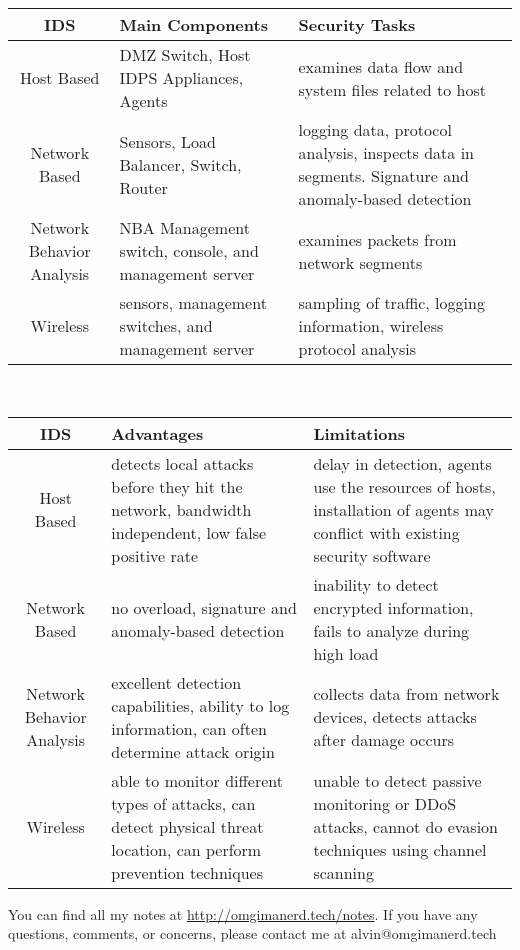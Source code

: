 \documentclass{math}
\begin{document}
\begin{center}
  \begin{tabular}{|c|p{4.5cm}|p{4.5cm}|}
    \hline
    IDS & Main Components & Security Tasks \\
    \hline
    Host Based & DMZ Switch, Host IDPS Appliances, Agents & examines data flow
      and system files related to host \\
    \hline
    Network Based & Sensors, Load Balancer, Switch, Router & logging data,
      protocol analysis, inspects data in segments. Signature and anomaly-based
      detection \\
    \hline
    Network Behavior Analysis & NBA Management switch, console, and management
      server & examines packets from network segments \\
    \hline
    Wireless & sensors, management switches, and management server & sampling of
      traffic, logging information, wireless protocol analysis \\
    \hline
  \end{tabular} \\[2cm]
  \begin{tabular}{|c|p{4.5cm}|p{4.5cm}|}
    \hline
    IDS & Advantages & Limitations \\
    \hline
    Host Based & detects local attacks before they hit the network, bandwidth
      independent, low false positive rate & delay in detection, agents use the
      resources of hosts, installation of agents may conflict with existing
      security software \\
    \hline
    Network Based & no overload, signature and anomaly-based detection &
      inability to detect encrypted information, fails to analyze during high
      load \\
    \hline
    Network Behavior Analysis & excellent detection capabilities, ability to log
      information, can often determine attack origin & collects data from
      network devices, detects attacks after damage occurs \\
    \hline
    Wireless & able to monitor different types of attacks, can detect physical
      threat location, can perform prevention techniques & unable to detect
      passive monitoring or DDoS attacks, cannot do evasion techniques using
      channel scanning \\
    \hline
  \end{tabular}
\end{center}

\begin{center}
  You can find all my notes at \url{http://omgimanerd.tech/notes}. If you have
  any questions, comments, or concerns, please contact me at
  alvin@omgimanerd.tech
\end{center}
\end{document}
